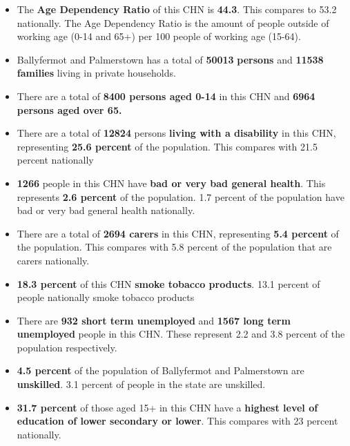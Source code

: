 \documentclass{article}
\begin{document}
\begin{itemize}

\item The \textbf{Age Dependency Ratio} of this CHN is  \textbf{44.3}. This compares to 53.2 nationally. The Age Dependency Ratio is the amount of people outside of working age (0-14 and 65+) per 100 people of working age (15-64). 

\item Ballyfermot and Palmerstown has a total of \textbf{\num{50013}} \textbf{persons} and  \textbf{\num{11538}} \textbf{families} living in private households.

\item There are a total of \textbf{\num{8400} persons aged 0-14} in this CHN and \textbf{\num{6964} persons aged over 65.} 

\item There are a total of \textbf{\num{12824}} persons \textbf{living with a disability} in this CHN, representing \textbf{25.6 percent} of the population. This compares with  21.5 percent nationally

\item \textbf{\num{1266}} people in this CHN have \textbf{bad or very bad general health}. This represents \textbf{2.6 percent} of the population. 1.7 percent of the population have bad or very bad general health nationally. 

\item There are a total of \textbf{\num{2694} carers} in this CHN, representing \textbf{5.4 percent} of the population. This compares with 5.8 percent of the population that are carers nationally. 

\item \textbf{18.3 percent} of this CHN \textbf{smoke tobacco products}. 13.1 percent of people nationally smoke tobacco products

\item There are \textbf{\num{932} short term unemployed} and \textbf{\num{1567} long term unemployed} people in this CHN. These represent 2.2 and 3.8 percent of the population respectively.

\item  \textbf{4.5 percent} of the population of Ballyfermot and Palmerstown are \textbf{unskilled}. 3.1 percent of people in the state are unskilled.

\item \textbf{31.7 percent} of those aged 15+ in this CHN have a \textbf{highest level of education of lower secondary or lower}. This compares with 23 percent nationally. 


\end{itemize}
\end{document}
